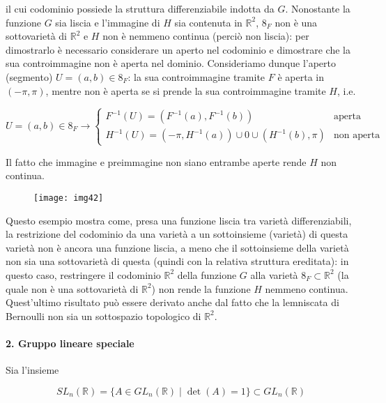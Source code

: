 il cui codominio possiede la struttura differenziabile indotta da $ G $. Nonostante la funzione $ G $ sia liscia e l'immagine di $ H $ sia contenuta in $ \mathbb{R}^{2} $, $ \mathfrak{8}_{F} $ non è una sottovarietà di $ \mathbb{R}^{2} $ e $ H $ non è nemmeno continua (perciò non liscia): per dimostrarlo è necessario considerare un aperto nel codominio e dimostrare che la sua controimmagine non è aperta nel dominio. Consideriamo dunque l'aperto (segmento) $ U = (a,b) \in \mathfrak{8}_{F} $: la sua controimmagine tramite $ F $ è aperta in $ (-\pi,\pi) $, mentre non è aperta se si prende la sua controimmagine tramite $ H $, i.e.

\begin{equation}
	U = (a,b) \in \mathfrak{8}_{F}%
	\rightarrow%
	\begin{cases}
		F^{-1}(U) = (F^{-1}(a),F^{-1}(b)) & \text{aperta}\\
		H^{-1}(U) = (-\pi,H^{-1}(a)) \cup 0 \cup (H^{-1}(b),\pi) & \text{non aperta}
	\end{cases}
\end{equation}

Il fatto che immagine e preimmagine non siano entrambe aperte rende $ H $ non continua.

\begin{figure}[H]
	\centering
	\texttt{[image: img42]}
\end{figure}

Questo esempio mostra come, presa una funzione liscia tra varietà differenziabili, la restrizione del codominio da una varietà a un sottoinsieme (varietà) di questa varietà non è ancora una funzione liscia, a meno che il sottoinsieme della varietà non sia una sottovarietà di questa (quindi con la relativa struttura ereditata): in questo caso, restringere il codominio $ \mathbb{R}^{2} $ della funzione $ G $ alla varietà $ \mathfrak{8}_{F} \subset \mathbb{R}^{2} $ (la quale non è una sottovarietà di $ \mathbb{R}^{2} $) non rende la funzione $ H $ nemmeno continua. Quest'ultimo risultato può essere derivato anche dal fatto che la lemniscata di Bernoulli non sia un sottospazio topologico di $ \mathbb{R}^{2} $.

\paragraph{2. Gruppo lineare speciale}\label{ex-slnr}

Sia l'insieme

\begin{equation}
	SL_{n}(\mathbb{R}) = \{ A \in GL_{n}(\mathbb{R}) \mid \det(A)=1 \} \subset GL_{n}(\mathbb{R})
\end{equation}

